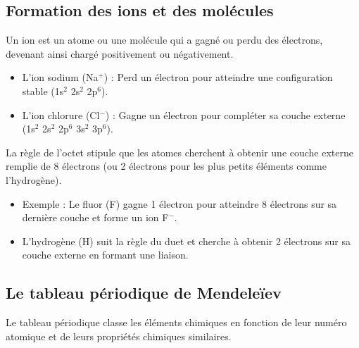 \documentclass{article}
\begin{document}
\subsection{Formation des ions et des molécules}
\begin{tcolorbox}[colback=green!10!white, colframe=green!75!black, title=Définition : ]
  Un ion est un atome ou une molécule qui a gagné ou perdu des électrons, devenant ainsi chargé positivement ou négativement.
\end{tcolorbox}

\begin{tcolorbox}[colback=blue!10!white, colframe=blue!75!black, title=Exemple : Ions courants]
  \begin{itemize}[noitemsep]
    \item L'ion sodium (Na$^+$) : Perd un électron pour atteindre une configuration stable (1s$^2$ 2s$^2$ 2p$^6$).
    \item L'ion chlorure (Cl$^-$) : Gagne un électron pour compléter sa couche externe (1s$^2$ 2s$^2$ 2p$^6$ 3s$^2$ 3p$^6$).
  \end{itemize}
\end{tcolorbox}

\begin{tcolorbox}[colback=blue!10!white, colframe=blue!75!black, title=Application : Règle de l'octet et du duet]
  La règle de l'octet stipule que les atomes cherchent à obtenir une couche externe remplie de 8 électrons (ou 2 électrons pour les plus petits éléments comme l'hydrogène).
  \begin{itemize}[noitemsep]
    \item Exemple : Le fluor (F) gagne 1 électron pour atteindre 8 électrons sur sa dernière couche et forme un ion F$^-$.
    \item L'hydrogène (H) suit la règle du duet et cherche à obtenir 2 électrons sur sa couche externe en formant une liaison.
  \end{itemize}
\end{tcolorbox}

\subsection{Le tableau périodique de Mendeleïev}
\begin{tcolorbox}[colback=green!10!white, colframe=green!75!black, title=Définition : ]
  Le tableau périodique classe les éléments chimiques en fonction de leur numéro atomique et de leurs propriétés chimiques similaires.
\end{tcolorbox}
\end{document}
